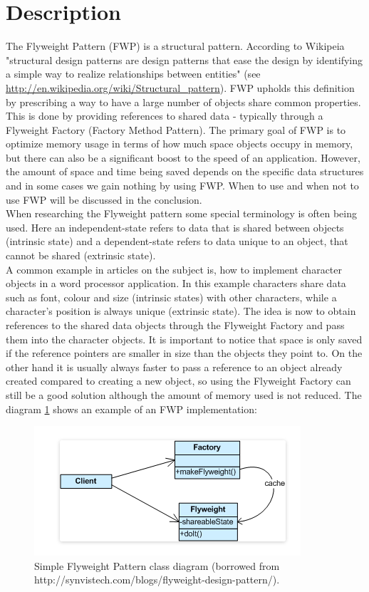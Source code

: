 \section{Description}
The Flyweight Pattern (FWP) is a structural pattern. According to Wikipeia "structural design patterns are design patterns that ease the design by identifying a simple way to realize relationships between entities" (see \url{http://en.wikipedia.org/wiki/Structural_pattern}). FWP upholds this definition by prescribing a way to have a large number of objects share common properties. This is done by providing references to shared data - typically through a Flyweight Factory (Factory Method Pattern). The primary goal of FWP is to optimize memory usage in terms of how much space objects occupy in memory, but there can also be a significant boost to the speed of an application. However, the amount of space and time being saved depends on the specific data structures and in some cases we gain nothing by using FWP. When to use and when not to use FWP will be discussed in the conclusion.\\

When researching the Flyweight pattern some special terminology is often being used. Here an independent-state refers to data that is shared between objects (intrinsic state) and a dependent-state refers to data unique to an object, that cannot be shared (extrinsic state).\\

A common example in articles on the subject is, how to implement character objects in a word processor application. In this example characters share data such as font, colour and size (intrinsic states) with other characters, while a character's position is always unique (extrinsic state). The idea is now to obtain references to the shared data objects through the Flyweight Factory and pass them into the character objects. It is important to notice that space is only saved if the reference pointers are smaller in size than the objects they point to. On the other hand it is usually always faster to pass a reference to an object already created compared to creating a new object, so using the Flyweight Factory can still be a good solution although the amount of memory used is not reduced. The diagram \ref{fig:FlyweightPattern} shows an example of an FWP implementation:

\begin{figure}[h]
	\centering
	\includegraphics[width=0.7\linewidth]{Content/Pattern_example.png}
	\caption{Simple Flyweight Pattern class diagram (borrowed from http://synvistech.com/blogs/flyweight-design-pattern/).}

	\label{fig:FlyweightPattern}
\end{figure}

 